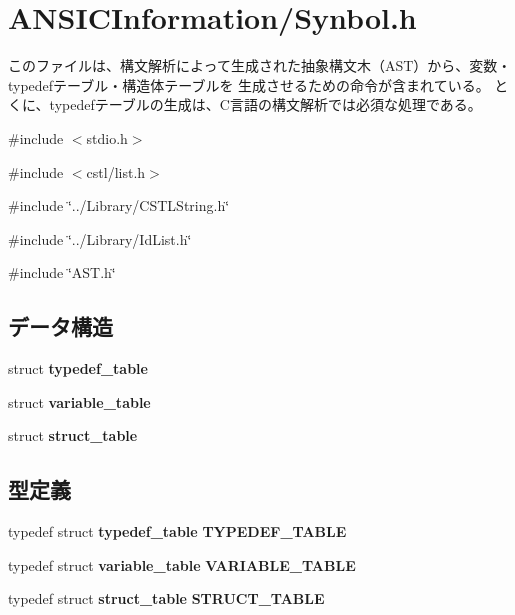 \section{ANSICInformation/Synbol.h}
\label{Synbol_8h}


このファイルは、構文解析によって生成された抽象構文木（AST）から、変数・typedefテーブル・構造体テーブルを 生成させるための命令が含まれている。 とくに、typedefテーブルの生成は、C言語の構文解析では必須な処理である。  


{\ttfamily \#include $<$stdio.h$>$}\par
{\ttfamily \#include $<$cstl/list.h$>$}\par
{\ttfamily \#include \char`\"{}../Library/CSTLString.h\char`\"{}}\par
{\ttfamily \#include \char`\"{}../Library/IdList.h\char`\"{}}\par
{\ttfamily \#include \char`\"{}AST.h\char`\"{}}\par
\subsection*{データ構造}
\begin{DoxyCompactItemize}
\item 
struct {\bf typedef\_\-table}
\item 
struct {\bf variable\_\-table}
\item 
struct {\bf struct\_\-table}
\end{DoxyCompactItemize}
\subsection*{型定義}
\begin{DoxyCompactItemize}
\item 
typedef struct {\bf typedef\_\-table} {\bf TYPEDEF\_\-TABLE}
\item 
typedef struct {\bf variable\_\-table} {\bf VARIABLE\_\-TABLE}
\item 
typedef struct {\bf struct\_\-table} {\bf STRUCT\_\-TABLE}
\end{DoxyCompactItemize}
